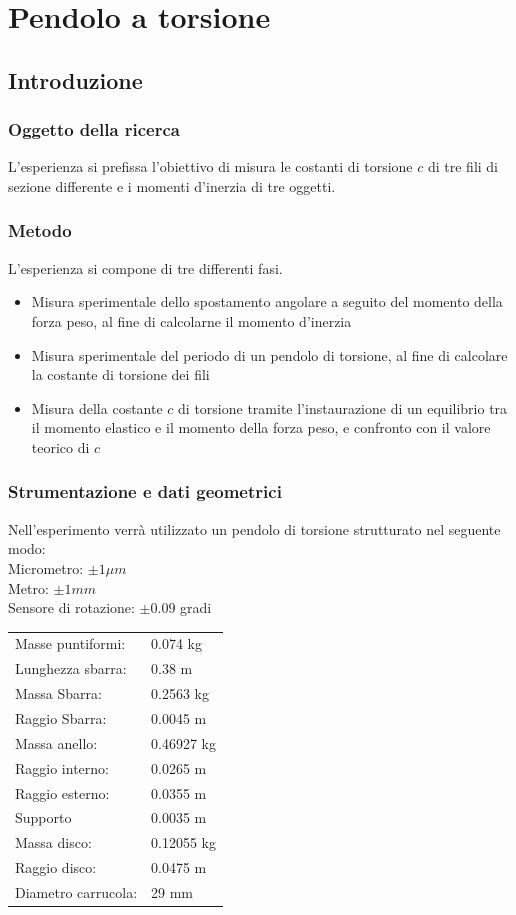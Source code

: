 \chapter{Pendolo a torsione}
\section{Introduzione}
\subsection{Oggetto della ricerca}
L'esperienza si prefissa l'obiettivo di misura le costanti di torsione $c$ di tre fili di sezione differente e i momenti d'inerzia di tre oggetti.
\subsection{Metodo}
L'esperienza si compone di tre differenti fasi.
\begin{itemize}
\item Misura sperimentale dello spostamento angolare a seguito del momento della forza peso, al fine di calcolarne il momento d'inerzia 
\item Misura sperimentale del periodo di un pendolo di torsione, al fine di calcolare la costante di torsione dei fili
\item Misura della costante $c$ di torsione tramite l'instaurazione di un equilibrio tra il momento elastico e il momento della forza peso, e confronto con il valore teorico di $c$
\end{itemize}
\subsection{ Strumentazione e dati geometrici}
Nell'esperimento verrà utilizzato un pendolo di torsione strutturato nel seguente modo:
\\
Micrometro: $ \pm 1 \mu m$
 \\
Metro: $\pm 1 mm$
\\
Sensore di rotazione: $\pm 0.09$ gradi
\\

\begin{tabular}{ll}
Masse puntiformi: & 0.074 kg\\
Lunghezza sbarra: & 0.38 m\\
Massa Sbarra: & 0.2563 kg\\
Raggio Sbarra: & 0.0045 m\\
\midrule
Massa anello: & 0.46927 kg\\
Raggio interno: & 0.0265 m\\
Raggio esterno: & 0.0355 m\\
\midrule
Supporto & 0.0035 m\\
\midrule
Massa disco: & 0.12055 kg\\
Raggio disco: & 0.0475 m\\
Diametro carrucola: & 29 mm\\
\end{tabular}

